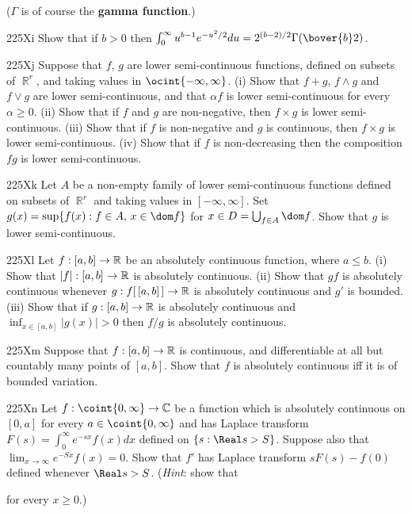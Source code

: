 {($\Gamma$ is of course the {\bf gamma function}.)

\spheader 225Xi Show that if $b>0$ then
$\int_0^{\infty}u^{b-1}e^{-u^2/2}du=2^{(b-2)/2}\Gamma(\bover{b}2)$.

\spheader 225Xj Suppose that $f$, $g$ are
lower semi-continuous functions, defined on subsets of $\BbbR^r$,
and taking values in $\ocint{-\infty,\infty}$.   (i) Show that $f+g$,
$f\wedge g$ and $f\vee g$ are lower semi-continuous, and that
$\alpha f$ is lower
semi-continuous for every $\alpha\ge 0$.   (ii) Show that if $f$ and $g$
are non-negative, then $f\times g$ is lower semi-continuous.
(iii) Show that if $f$ is non-negative and $g$ is continuous, then
$f\times g$ is lower semi-continuous.   (iv) Show that if $f$ is
non-decreasing then the composition $fg$ is lower semi-continuous.

\spheader 225Xk Let $A$ be a non-empty family of lower
semi-continuous functions defined on subsets of $\BbbR^r$ and taking
values in $[-\infty,\infty]$.   Set $g(x)=\sup\{f(x):f\in A,\,x\in\dom
f\}$ for $x\in
D=\bigcup_{f\in A}\dom f$.   Show that $g$ is lower
semi-continuous.

\spheader 225Xl Let $f:[a,b]\to\Bbb R$ be an absolutely continuous
function, where $a\le b$.   (i) Show that $|f|:[a,b]\to\Bbb R$ is
absolutely continuous.   (ii)  Show that $gf$ is absolutely continuous
whenever $g:f[\,[a,b]\,]\to\Bbb R$ is absolutely continuous and
$g'$ is bounded.   (iii) Show that if $g:[a,b]\to\Bbb R$ is absolutely
continuous and $\inf_{x\in[a,b]}|g(x)|>0$ then
$f/g$ is absolutely continuous.

\spheader 225Xm Suppose that $f:[a,b]\to\Bbb R$ is continuous, and
differentiable at all but countably many
points of $[a,b]$.   Show that $f$ is absolutely continuous iff it is of
bounded variation.

\spheader 225Xn Let $f:\coint{0,\infty}\to\Bbb C$ be a function
which is absolutely continuous on $[0,a]$ for every
$a\in\coint{0,\infty}$ and has Laplace transform
$F(s)=\int_0^{\infty}e^{-sx}f(x)dx$ defined on $\{s:\Real s>S\}$.
Suppose also that $\lim_{x\to\infty}e^{-Sx}f(x)=0$.   Show
that $f'$ has Laplace transform $sF(s)-f(0)$ defined whenever $\Real
s>S$.   ({\it Hint\/}:  show that


\noindent for every $x\ge 0$.)

}
